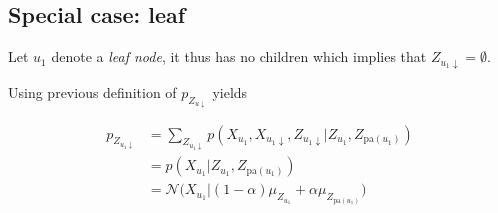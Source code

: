 \subsection*{Special case: leaf}
Let $u_1$ denote a \textit{leaf node}, it thus has no children which implies that $Z_{u_1 \downarrow} = \emptyset$.

Using previous definition of $p_{Z_{u \downarrow}}$ yields

 \begin{align}
   p_{Z_{u_1 \downarrow}} & = \sum_{Z_{u_1 \downarrow}} p(X_{u_1}, X_{u_1 \downarrow}, Z_{u_1 \downarrow}|Z_{u_1}, Z_{\text{pa}(u_1)}) \nonumber\\
   & = p(X_{u_1}|Z_{u_1}, Z_{\text{pa}(u_1)}) \nonumber\\
   & = \mathcal{N}\Big(X_{u_1} | (1-\alpha)\mu_{Z_{u_1}} + \alpha \mu_{Z_{\text{pa}(u_1)}} \Big)
 \end{align}

